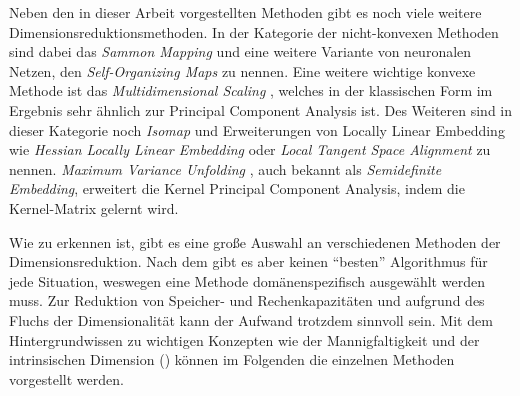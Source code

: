 Neben den in dieser Arbeit vorgestellten Methoden gibt es noch viele weitere
Dimensionsreduktionsmethoden. In der Kategorie der nicht-konvexen Methoden sind dabei das
\textit{Sammon Mapping} \parencite{Sammon.1969} und eine weitere Variante von neuronalen Netzen, den \textit{Self-Organizing
	Maps} \parencite{Kohonen.1990} zu nennen. Eine weitere wichtige konvexe Methode ist das
\textit{Multidimensional Scaling} \parencites{Kruskal.1964}{Cox.2008}, welches in der klassischen Form im Ergebnis sehr ähnlich zur
Principal Component Analysis ist. Des Weiteren sind in dieser Kategorie noch \textit{Isomap} \parencite{Tenenbaum.2000} und Erweiterungen von Locally Linear Embedding wie \textit{Hessian Locally
	Linear Embedding} \parencite{Donoho.2003} oder \textit{Local Tangent Space Alignment} \parencite{Zhang.2002} zu nennen. \textit{Maximum Variance Unfolding} \parencite{Weinberger.2006}, auch bekannt als \textit{Semidefinite Embedding}, erweitert die Kernel
Principal Component Analysis, indem die Kernel-Matrix gelernt wird.

Wie zu erkennen ist, gibt es eine große Auswahl an verschiedenen Methoden der Dimensionsreduktion.
Nach dem  \parencite{Wolpert.1997} gibt es aber keinen \enquote{besten} Algorithmus für jede Situation, weswegen
eine Methode domänenspezifisch ausgewählt werden muss. Zur Reduktion von Speicher- und
Rechenkapazitäten und aufgrund des Fluchs der Dimensionalität kann der Aufwand trotzdem sinnvoll
sein. Mit dem Hintergrundwissen zu wichtigen Konzepten wie der Mannigfaltigkeit und der
intrinsischen Dimension () können im
Folgenden die einzelnen Methoden vorgestellt werden.